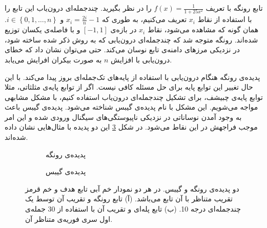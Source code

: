 \documentclass[12pt,onecolumn,a4paper]{article}
\begin{document}
تابع رونگه با تعریف 
$f(x)=\frac{1}{1+25x^2}$ 
را در نظر بگیرید. چندجمله‌ای درون‌یاب این تابع را با استفاده از نقاط 
$x_i$ 
تعریف می‌کنیم، به طوری که
$x_{i}=\frac{2i}{n}-1$ 
و 
$i\in \left\{0,1,\dots ,n\right\}$.
همان گونه که مشاهده می‌شود، نقاط 
$x_i$ 
در بازه‌ی 
$[-1,1]$ 
و با فاصله‌ی یکسان توزیع شده‌اند. رونگه متوجه شد که چندجمله‌ای درون‌یابی که به روش ذکر شده ساخته شود، در نزدیکی مرز‌های دامنه‌ی تابع نوسان می‌کند. حتی می‌توان نشان داد که خطای درون‌یابی با افزایش 
$n$ 
 به صورت بیکران افرایش می‌یابد.

پدیده‌ی رونگه هنگام درون‌یابی با استفاده از پایه‌های تک‌جمله‌ای 
بروز پیدا می‌کند. با این حال تغییر این توابع پایه برای حل مسئله کافی نیست. اگر از توابع پایه‌ی مثلثاتی، مثلا توابع پایه‌ی چبیشف، برای تشکیل چندجمله‌ای درون‌یاب استفاده کنیم، با مشکل مشابهی مواجه می‌شویم. این مشکل  با نام پدیده‌ی گیبس
شناخته می‌شود. پدیده‌ی گیبس باعث به وجود آمدن نوساناتی در نزدیکی ناپیوستگی‌های سیگنال ورودی شده و این امر موجب فراجهش
در این نقاط می‌شود. در شکل 
\ref{fig:runge_gibbs} 
این دو پدیده با مثال‌هایی نشان داده‌ شده‌اند.

 \begin{figure}
    \centering
    \begin{subfigure}[b]{0.45\textwidth}
        \centering
        \caption{پدیده‌ی رونگه}
        \label{fig:runge}
    \end{subfigure}
    \hfill
    \begin{subfigure}[b]{0.45\textwidth}
        \centering
        \caption{پدیده‌ی گیبس}
        \label{fig:gibbs}
    \end{subfigure}
       \caption{دو پدیده‌ی رونگه و گیبس. در هر دو نمودار خم آبی تابع هدف و خم قرمز تقریب متناظر با آن تابع می‌باشد. (آ) تابع رونگه و تقریب آن توسط یک چندجمله‌ای درجه 10. (ب) تابع پله‌ای و تقریب آن با استفاده از 30 جمله‌ی اول سری فوریه‌ی متناظر آن.}
       \label{fig:runge_gibbs}
\end{figure}
\end{document}
